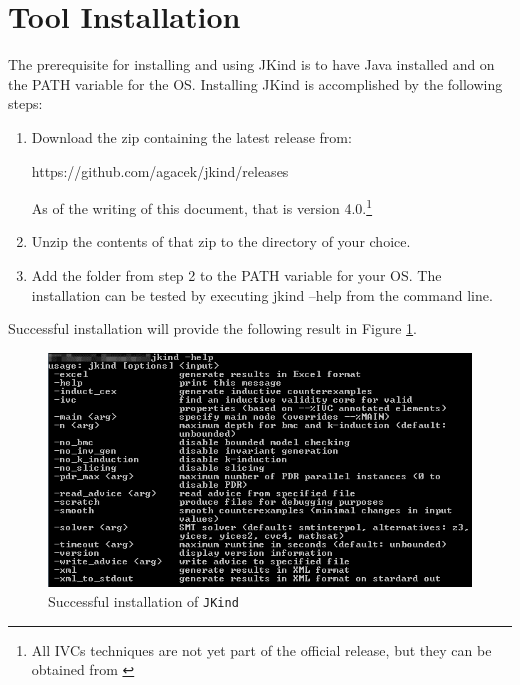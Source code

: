 \section{Tool Installation}
The prerequisite for installing and using JKind is to have Java installed and on the PATH variable for the OS.
Installing JKind is accomplished by the following steps:
\begin{enumerate}
  \item Download the zip containing the latest release from:
  
   https://github.com/agacek/jkind/releases 
   
   As of the writing of this document, that is version 4.0.\footnote{All IVCs techniques are not yet part of the official release, but they can be obtained from \cite{mygit}}
  \item Unzip the contents of that zip to the directory of your choice.
  \item Add the folder from step 2 to the PATH variable for your OS.
The installation can be tested by executing jkind –help from the command line.
\end{enumerate}
Successful installation will provide the following result in Figure \ref{fig:jkins}.

 \begin{figure}
 \centering
  \includegraphics[width=\columnwidth]{figs/jkindcon.png}
  \caption{Successful installation of \texttt{JKind}}
  \vspace{0.1in}
  \label{fig:jkins}
\end{figure}

